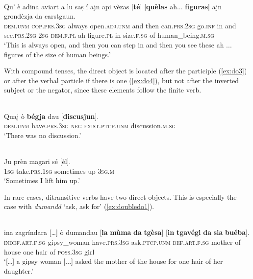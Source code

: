 \ea\label{ex:do2}
\\
\gll  Qu’ è adina aviart a lu saṣ í ajn api vèzas [\textbf{té}] [\textbf{quèlas} ah... \textbf{figuras}] ajn grondèzja da carstgaun.\\
\textsc{dem.unm} \textsc{cop.prs.3sg} always open.\textsc{adj.unm} and then can.\textsc{prs.2sg} go.\textsc{inf} in and see.\textsc{prs.2sg} \textsc{2sg} \textsc{dem.f.pl} ah figure.\textsc{pl} in size.\textsc{f.sg} of human\_being.\textsc{m.sg} \\
\glt `This is always open, and then you can step in and then you see these ah ... figures of the size of human beings.'
\z

With compound tenses, the direct object is located after the participle (\ref{ex:do3}) or after the verbal particle if there is one (\ref{ex:do4}), but not after the inverted subject or the negator, since these elements follow the finite verb.

\ea\label{ex:do3}
\\
\gll    Quaj ò \textbf{bégja} dau [\textbf{discusjun}].\\
\textsc{dem.unm} have.\textsc{prs.3sg} \textsc{neg} \textsc{exist.ptcp.unm} discussion.\textsc{m.sg}\\
\glt `There was no discussion.'
\z

\ea
\label{ex:do4}
\\
\gll  Ju prèn magari sé [èl].  \\
\textsc{1sg} take.\textsc{prs.1sg} sometimes up \textsc{3sg.m}\\
\glt `Sometimes I lift him up.'
\z

In rare cases, ditransitive verbs have two direct objects. This is especially the case with \textit{dumandá} `ask, ask for' (\ref{ex:doubledo1}).

\ea
\label{ex:doubledo1}
 {\citealt[131]{Büchli1966}}\\
\gll  [...]  ina zagríndara […] ò dumandau [\textbf{la} \textbf{mùma} \textbf{da} \textbf{tgèsa}] [\textbf{in} \textbf{tgavégl} \textbf{da} \textbf{sia} \textbf{buéba}]. \\
{} \textsc{indef.art.f.sg} gipsy\_woman {} have.\textsc{prs.3sg}   ask.\textsc{ptcp.unm} \textsc{def.art.f.sg} mother of house one hair of \textsc{poss.3sg} girl \\
\glt `[…] a gipsy woman [...] asked the mother of the house for one hair of her daughter.'
\z

